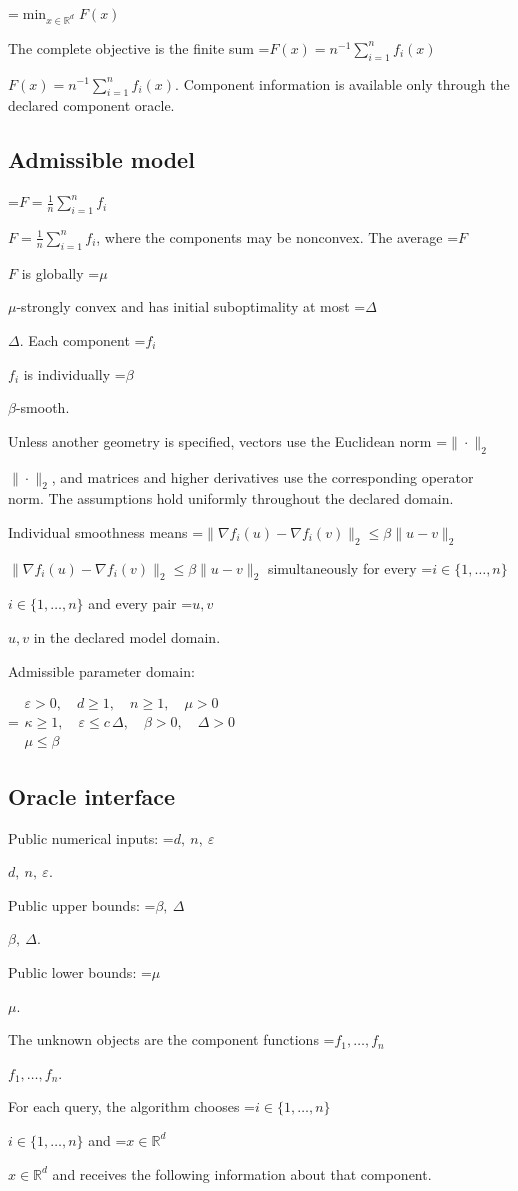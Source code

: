 \documentclass[10pt,a4paper]{article}
\newcommand{\AtlasMath}[1]{\par\begingroup\centering\setbox0=\hbox{$\displaystyle #1$}\ifdim\wd0>1.4\linewidth\typeout{ATLAS WIDE FORMULA: \the\wd0}\fi\ifdim\wd0>\linewidth\resizebox{\linewidth}{!}{\box0}\else\box0\fi\par\endgroup}
\newcommand{\AtlasInlineMath}[1]{\begingroup\setbox0=\hbox{$#1$}\ifdim\wd0>.4\linewidth\endgroup\AtlasMath{#1}\else\endgroup$#1$\fi}
\begin{document}
\AtlasMath{\min_{x\in \mathbb{R}^d}F(x)}


The complete objective is the finite sum \AtlasInlineMath{F(x)=n^{-1}\sum_{i=1}^n f_i(x)}. Component information is available only through the declared component oracle.

\subsection{Admissible model}
\AtlasInlineMath{F=\frac1n\sum_{i=1}^n f_i}, where the components may be nonconvex. The average \AtlasInlineMath{F} is globally \AtlasInlineMath{\mu}-strongly convex and has initial suboptimality at most \AtlasInlineMath{\Delta}. Each component \AtlasInlineMath{f_i} is individually \AtlasInlineMath{\beta}-smooth.

Unless another geometry is specified, vectors use the Euclidean norm \AtlasInlineMath{\|\cdot\|_2}, and matrices and higher derivatives use the corresponding operator norm. The assumptions hold uniformly throughout the declared domain.

Individual smoothness means \AtlasInlineMath{\|\nabla f_i(u)-\nabla f_i(v)\|_2\le\beta\|u-v\|_2} simultaneously for every \AtlasInlineMath{i\in\{1,\ldots,n\}} and every pair \AtlasInlineMath{u,v} in the declared model domain.

Admissible parameter domain:


\AtlasMath{\begin{gathered}\varepsilon > 0,\quad d \ge 1,\quad n \ge 1,\quad \mu > 0\\\kappa \ge 1,\quad \varepsilon \le c\,\Delta,\quad \beta > 0,\quad \Delta > 0\\\mu \le \beta\end{gathered}}


\subsection{Oracle interface}
Public numerical inputs: \AtlasInlineMath{d,\ n,\ \varepsilon}.

Public upper bounds: \AtlasInlineMath{\beta,\ \Delta}.

Public lower bounds: \AtlasInlineMath{\mu}.

The unknown objects are the component functions \AtlasInlineMath{f_1,\ldots,f_n}.

For each query, the algorithm chooses \AtlasInlineMath{i\in\{1,\ldots,n\}} and \AtlasInlineMath{x\in\mathbb R^d} and receives the following information about that component.
\end{document}

